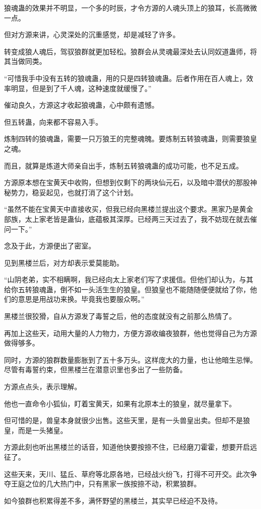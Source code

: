 \begin{this_body}
狼魂蛊的效果并不明显，一个多的时辰，才令方源的人魂头顶上的狼耳，长高微微一点。

但对方源来讲，心灵深处的沉重感觉，却是减轻了许多。

转变成狼人魂后，驾驭狼群就更加轻松。狼群会从灵魂最深处去认同奴道蛊师，将其当做同类。

“可惜我手中没有五转的狼魂蛊，用的只是四转狼魂蛊。后者作用在百人魂上，效率明显，但是到了千人魂，这种速度就缓慢了。”

催动良久，方源这才收起狼魂蛊，心中颇有遗憾。

但五转蛊，向来都不容易入手。

炼制四转的狼魂蛊，需要一只万狼王的完整魂魄。要炼制五转狼魂蛊，则需要狼皇之魂。

而且，就算是炼道大师亲自出手，炼制五转狼魂蛊的成功可能，也不足五成。

方源原本想在宝黄天中收购，但想到仅剩下的两块仙元石，以及暗中潜伏的那股神秘势力，稳妥起见，也就打消了这个计划。

“虽然不能在宝黄天中直接收买，但我已经向黑楼兰提出这个要求。黑家乃是黄金部族，太上家老皆是蛊仙，底蕴极其深厚。已经两三天过去了，我不妨现在就去催问一下。”

念及于此，方源便出了密室。

见到黑楼兰后，对方却表示爱莫能助。

“山阴老弟，实不相瞒啊，我已经向太上家老们写了求援信。但他们却认为，与其给你五转狼魂蛊，倒不如一头活生生的狼皇。但狼皇也不能随随便便就给了你，他们的意思是用战功来换。毕竟我也要服众啊。”

黑楼兰很狡猾，自从方源发了毒誓之后，他的态度就没有之前那么热情了。

再加上这些天，动用大量的人力物力，方便方源收编夜狼群，他也觉得自己为方源做得够多。

同时，方源的狼群数量膨胀到了五十多万头。这样庞大的力量，也让他暗生忌惮。尽管有毒誓约束，但黑楼兰在潜意识里也多出了一些防备。

方源点点头，表示理解。

他也一直命令小狐仙，盯着宝黄天，如果有北原本土的狼皇，就尽量拿下。

但可惜的是，兽皇本身就很少出售。这些天里，是有一头兽皇出卖。但却不是狼皇，而是一头猪皇。

方源此刻也听出黑楼兰的话音，知道他快要按捺不住，已经磨刀霍霍，想要开启远征了。

这些天来，天川、猛丘、草府等北原各地，已经战火纷飞，打得不可开交。此次争夺王庭之位的几大热门中，只有黑家一族按捺不动，积累狼群。

如今狼群也积累得差不多，满怀野望的黑楼兰，其实早已经迫不及待。


\end{this_body}
